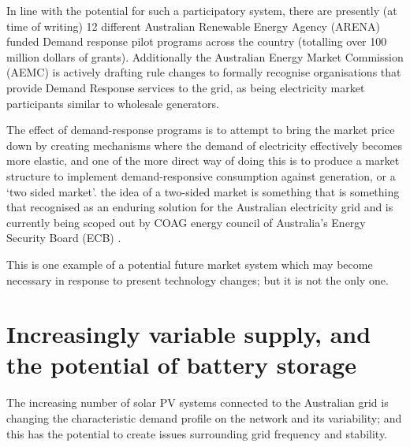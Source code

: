 In line with the potential for such a participatory system, there are presently (at time of writing) 12 different Australian Renewable Energy Agency (ARENA) funded Demand response pilot programs across the country (totalling over 100 million dollars of grants).
Additionally the Australian Energy Market Commission (AEMC) is actively drafting rule changes to formally recognise organisations that provide Demand Response services to the grid, as being electricity market participants similar to wholesale generators.\cite{australianenergymarketcommission2020}

The effect of demand-response programs is to attempt to bring the market price down by creating mechanisms where the demand of electricity effectively becomes more elastic, and one of the more direct way of doing this is to produce a market structure to implement demand-responsive consumption against generation, or a `two sided market'.
the idea of a two-sided market is something that is something that recognised as an enduring solution for the Australian electricity grid \cite{australianenergymarketcommission2020} and is currently being scoped out by COAG energy council of Australia's Energy Security Board (ECB) \cite{energysecurityboard2020}.

This is one example of a potential future market system which may become necessary in response to present technology changes; but it is not the only one.

\section{Increasingly variable supply, and the potential of battery storage}

The increasing number of solar PV systems connected to the Australian grid is changing the characteristic demand profile on the network and its variability; and this has the potential to create issues surrounding grid frequency and stability.

